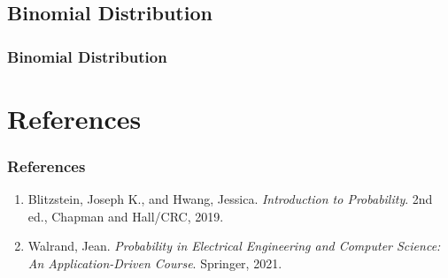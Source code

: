 \documentclass{beamer}
\begin{document}
\subsection{Binomial Distribution}
\begin{frame}
    \frametitle{Binomial Distribution}
\end{frame}
\section{References}
\begin{frame}
    \frametitle{References}
    \begin{enumerate}
        \item Blitzstein, Joseph K., and  Hwang, Jessica. \textit{Introduction to Probability}. 2nd ed., Chapman and Hall/CRC, 2019.
        \item Walrand, Jean. \textit{Probability in Electrical Engineering and Computer Science: An Application-Driven Course}. Springer, 2021.
    \end{enumerate}
\end{frame}
\end{document}
